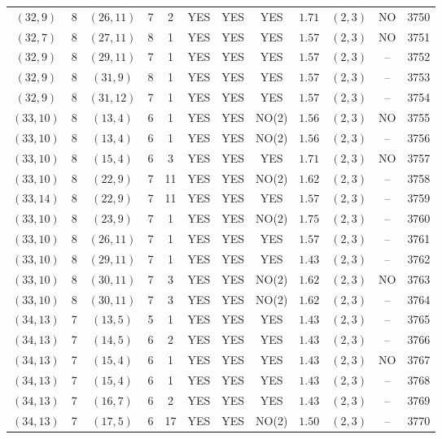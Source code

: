 \begin{longtable}{|c|c|c|c|c|c|c|c|c|c|c|c|}
$(32,9)$ & 8 & $(26,11)$ & 7 & 2 & YES & YES & YES & $1.71$ & $(2,3)$ & NO & 3750\\
$(32,7)$ & 8 & $(27,11)$ & 8 & 1 & YES & YES & YES & $1.57$ & $(2,3)$ & NO & 3751\\
$(32,9)$ & 8 & $(29,11)$ & 7 & 1 & YES & YES & YES & $1.57$ & $(2,3)$ & -- & 3752\\
$(32,9)$ & 8 & $(31,9)$ & 8 & 1 & YES & YES & YES & $1.57$ & $(2,3)$ & -- & 3753\\
$(32,9)$ & 8 & $(31,12)$ & 7 & 1 & YES & YES & YES & $1.57$ & $(2,3)$ & -- & 3754\\
$(33,10)$ & 8 & $(13,4)$ & 6 & 1 & YES & YES & NO(2) & $1.56$ & $(2,3)$ & NO & 3755\\
$(33,10)$ & 8 & $(13,4)$ & 6 & 1 & YES & YES & NO(2) & $1.56$ & $(2,3)$ & -- & 3756\\
$(33,10)$ & 8 & $(15,4)$ & 6 & 3 & YES & YES & YES & $1.71$ & $(2,3)$ & NO & 3757\\
$(33,10)$ & 8 & $(22,9)$ & 7 & 11 & YES & YES & NO(2) & $1.62$ & $(2,3)$ & -- & 3758\\
$(33,14)$ & 8 & $(22,9)$ & 7 & 11 & YES & YES & YES & $1.57$ & $(2,3)$ & -- & 3759\\
$(33,10)$ & 8 & $(23,9)$ & 7 & 1 & YES & YES & NO(2) & $1.75$ & $(2,3)$ & -- & 3760\\
$(33,10)$ & 8 & $(26,11)$ & 7 & 1 & YES & YES & YES & $1.57$ & $(2,3)$ & -- & 3761\\
$(33,10)$ & 8 & $(29,11)$ & 7 & 1 & YES & YES & YES & $1.43$ & $(2,3)$ & -- & 3762\\
$(33,10)$ & 8 & $(30,11)$ & 7 & 3 & YES & YES & NO(2) & $1.62$ & $(2,3)$ & NO & 3763\\
$(33,10)$ & 8 & $(30,11)$ & 7 & 3 & YES & YES & NO(2) & $1.62$ & $(2,3)$ & -- & 3764\\
$(34,13)$ & 7 & $(13,5)$ & 5 & 1 & YES & YES & YES & $1.43$ & $(2,3)$ & -- & 3765\\
$(34,13)$ & 7 & $(14,5)$ & 6 & 2 & YES & YES & YES & $1.43$ & $(2,3)$ & -- & 3766\\
$(34,13)$ & 7 & $(15,4)$ & 6 & 1 & YES & YES & YES & $1.43$ & $(2,3)$ & NO & 3767\\
$(34,13)$ & 7 & $(15,4)$ & 6 & 1 & YES & YES & YES & $1.43$ & $(2,3)$ & -- & 3768\\
$(34,13)$ & 7 & $(16,7)$ & 6 & 2 & YES & YES & YES & $1.43$ & $(2,3)$ & -- & 3769\\
$(34,13)$ & 7 & $(17,5)$ & 6 & 17 & YES & YES & NO(2) & $1.50$ & $(2,3)$ & -- & 3770\\

\end{longtable}
